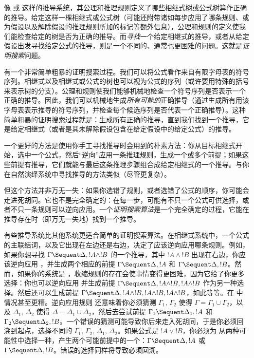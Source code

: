 \documentclass[../../../include/open-logic-section]{subfiles}
\begin{document}


像  或  这样的推导系统，其公理和推理规则定义了哪些相继式树或公式树算作正确的推导。给定这样一棵相继式或公式树（可能还附带诸如每步应用了哪条规则、或为假设以及解除假设的推理规则所加的标记等额外信息），公理和规则的定义使我们能检查给定的树是否为正确的推导。而\emph{寻找}一个给定相继式的推导，或者从给定假设出发寻找给定公式的推导，则是一个不同的、通常也更困难的问题。这就是\emph{证明搜索}问题。

有一个非常简单粗暴的证明搜索过程。我们可以将公式看作来自有限字母表的符号序列。相继式以及相继式或公式的树也可以视为公式的序列（或许要用特殊的括号来表示树的分支）。公理和规则使我们能够机械地检查一个符号序列是否表示一个正确的推导。因此，我们可以机械地生成\emph{所有可能的}正确推导（通过生成所有用该字母表表示推导的符号序列，并检查每个候选序列是否代表一个正确推导）。这种简单粗暴的证明搜索过程就是：生成所有正确的推导，直到我们找到一个推导，它是给定相继式（或者是其未解除假设包含在给定假设中的给定公式）的推导。

一个更好的方法是使用你手工寻找推导时会用到的朴素方法：你从目标相继式开始，选中一个公式，然后“逆向”应用一条推理规则，生成一个或多个前提；如果这些前提有推导，它们就能与最后这条推理步骤组合成给定相继式的一个推导。与你在自然演绎系统中寻找推导的方法类似（尽管更复杂）。

但这个方法并非万无一失：如果你选错了规则，或者选错了公式的顺序，你可能会走进死胡同。它也不是完全确定的：在每一步，可能有不只一个公式可供选择，或者不只一条规则可以逆向应用。一个\emph{证明搜索算法}是一个完全确定的过程，它能在推导存在时（即万无一失地）找到一个推导。

有些推导系统比其他系统更适合简单的证明搜索算法。在相继式系统中，一个公式的主联结词，以及它出现在左边还是右边，决定了应该逆向应用哪条规则。例如，如果你想寻找 $\Gamma \Sequent \Delta, !A \land !B$ 的一个推导，其中 $!A \land !B$ 出现在右边，你应该逆向应用 \RightR{\land}，并生成两个相应的前提 $\Gamma \Sequent \Delta, !A$ 和 $\Gamma \Sequent \Delta, !B$。然而，如果你的系统是 ，收缩规则的存在会使事情变得更困难，因为它给了你更多选择：你也可以逆向应用 \RightR{\Contraction} 并生成前提 $\Gamma \Sequent \Delta, !A \land
!B, !A \land !B$ 作为另一种选择。然后还可以生成前提 $\Gamma \Sequent
\Delta, !A \land !B, !A \land !B, !A \land !B$，如此等等。在  中情况甚至更糟。逆向应用规则 \RightR{\land} 还意味着你必须猜测 $\Gamma_1$, $\Gamma_2$ 使得 $\Gamma = \Gamma_1 \cup \Gamma_2$，以及 $\Delta_1$, $\Delta_2$ 使得 $\Delta = \Delta_1 \cup \Delta_2$，然后去尝试前提 $\Gamma_1 \Sequent \Delta_1, !A$ 和 $\Gamma_2 \Sequent \Delta_2, !B$。一个错误的猜测可能导致你后来走入死胡同，于是你必须回溯到起点，选择不同的 $\Gamma_1$, $\Gamma_2$, $\Delta_1$, $\Delta_2$。如果公式是 $!A \lor !B$，你必须为 \RightR{\lor} 从两种可能性中选择一种，产生两个可能前提中的一个：$\Gamma \Sequent \Delta, !A$ 或 $\Gamma \Sequent \Delta, !B$。错误的选择同样将导致必须回溯。
\end{document}
